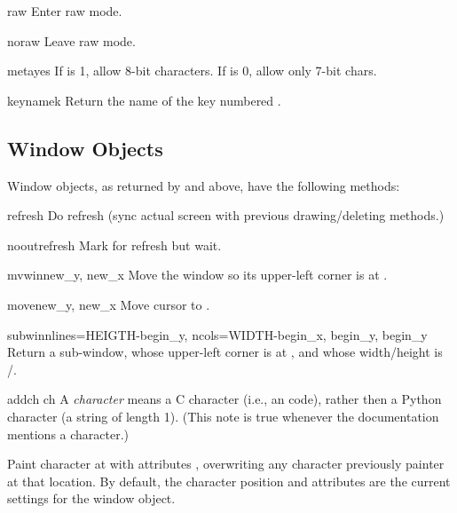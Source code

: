 \begin{funcdesc}{raw}{}
Enter raw mode.
\end{funcdesc}

\begin{funcdesc}{noraw}{}
Leave raw mode.
\end{funcdesc}

\begin{funcdesc}{meta}{yes}
If  is 1, allow 8-bit characters. If  is 0, 
allow only 7-bit chars.
\end{funcdesc}

\begin{funcdesc}{keyname}{k}
Return the name of the key numbered .
\end{funcdesc}


\subsection{Window Objects \label{curses-window-objects}}

Window objects, as returned by  and
 above, have the
following methods:

\begin{methoddesc}{refresh}{}
Do refresh (sync actual screen with previous drawing/deleting 
methods.)
\end{methoddesc}

\begin{methoddesc}{nooutrefresh}{}
Mark for refresh but wait.
\end{methoddesc}

\begin{methoddesc}{mvwin}{new_y, new_x}
Move the window so its upper-left corner is at .
\end{methoddesc}

\begin{methoddesc}{move}{new_y, new_x}
Move cursor to .
\end{methoddesc}

\begin{methoddesc}{subwin}{nlines=HEIGTH-begin_y, ncols=WIDTH-begin_x,
                           begin_y, begin_y}
Return a sub-window, whose upper-left corner is at
, and whose width/height is
/.
\end{methoddesc}

\begin{methoddesc}{addch}{ ch}
 A \emph{character} means a C character (i.e., an
\ASCII{} code), rather then a Python character (a string of length 1).
(This note is true whenever the documentation mentions a character.)

Paint character  at  with attributes
, overwriting any character previously painter at that
location.  By default, the character position and attributes are the
current settings for the window object.
\end{methoddesc}

